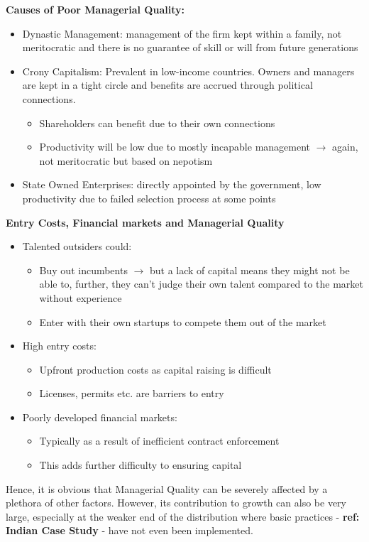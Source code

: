 \documentclass[12pt, letterpaper]{article}
\begin{document}
\textbf{Causes of Poor Managerial Quality:}
\begin{itemize}
	\item Dynastic Management: management of the firm kept within a family, not meritocratic and there is no guarantee of skill or will from future generations
	\item Crony Capitalism: Prevalent in low-income countries. Owners and managers are kept in a tight circle and benefits are accrued through political connections.
		\begin{itemize}
			\item Shareholders can benefit due to their own connections
			\item Productivity will be low due to mostly incapable management $\rightarrow$ again, not meritocratic but based on nepotism
		\end{itemize}
	\item State Owned Enterprises: directly appointed by the government, low productivity due to failed selection process at some points\\
\end{itemize}

\textbf{Entry Costs, Financial markets and Managerial Quality}
\begin{itemize}
	\item Talented outsiders could:
		\begin{itemize}
			\item Buy out incumbents $\rightarrow$ but a lack of capital means they might not be able to, further, they can't judge their own talent compared to the market without experience
			\item Enter with their own startups to compete them out of the market
		\end{itemize}
	\item High entry costs:
		\begin{itemize}
			\item Upfront production costs as capital raising is difficult
			\item Licenses, permits etc. are barriers to entry
		\end{itemize}
	\item Poorly developed financial markets:
		\begin{itemize}
			\item Typically as a result of inefficient contract enforcement
			\item This adds further difficulty to ensuring capital
		\end{itemize}
\end{itemize}
Hence, it is obvious that Managerial Quality can be severely affected by a plethora of other factors. However, its contribution to growth can also be very large, especially at the weaker end of the distribution where basic practices - \textbf{ref: Indian Case Study} - have not even been implemented.
\end{document}
